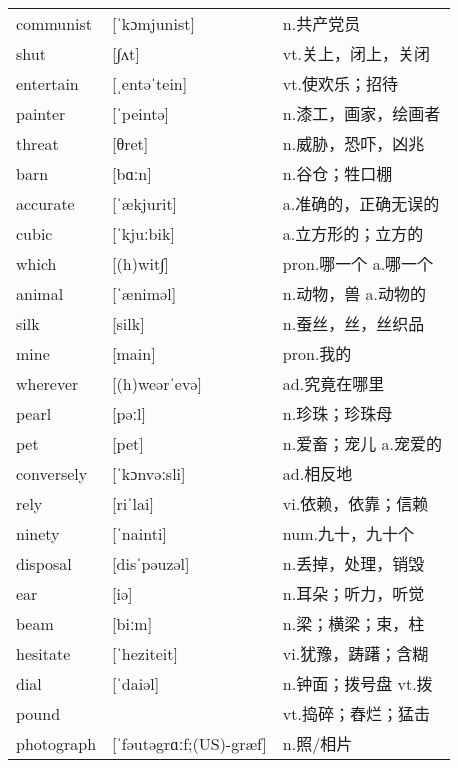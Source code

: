 \documentclass[a4paper]{article}
\begin{document}
\section{}
\begin{tabular}{l l l}

communist & [ˈkɔmjunist] & n.共产党员 \\
shut & [∫ʌt] & vt.关上，闭上，关闭 \\
entertain & [ˌentəˈtein] & vt.使欢乐；招待 \\
painter & [ˈpeintə] & n.漆工，画家，绘画者 \\
threat & [θret] & n.威胁，恐吓，凶兆 \\
barn & [bɑːn] & n.谷仓；牲口棚 \\
accurate & [ˈækjurit] & a.准确的，正确无误的 \\
cubic & [ˈkjuːbik] & a.立方形的；立方的 \\
which & [(h)wit∫] & pron.哪一个 a.哪一个 \\
animal & [ˈæniməl] & n.动物，兽 a.动物的 \\
silk & [silk] & n.蚕丝，丝，丝织品 \\
mine & [main] & pron.我的 \\
wherever & [(h)weərˈevə] & ad.究竟在哪里 \\
pearl & [pəːl] & n.珍珠；珍珠母 \\
pet & [pet] & n.爱畜；宠儿 a.宠爱的 \\
conversely & [ˈkɔnvəːsli] & ad.相反地 \\
rely & [riˈlai] & vi.依赖，依靠；信赖 \\
ninety & [ˈnainti] & num.九十，九十个 \\
disposal & [disˈpəuzəl] & n.丢掉，处理，销毁 \\
ear & [iə] & n.耳朵；听力，听觉 \\
beam & [biːm] & n.梁；横梁；束，柱 \\
hesitate & [ˈheziteit] & vi.犹豫，踌躇；含糊 \\
dial & [ˈdaiəl] & n.钟面；拨号盘 vt.拨 \\
pound &  & vt.捣碎；舂烂；猛击 \\
photograph & [ˈfəutəgrɑːf;(US)-græf] & n.照/相片 \\

\end{tabular}
\end{document}

